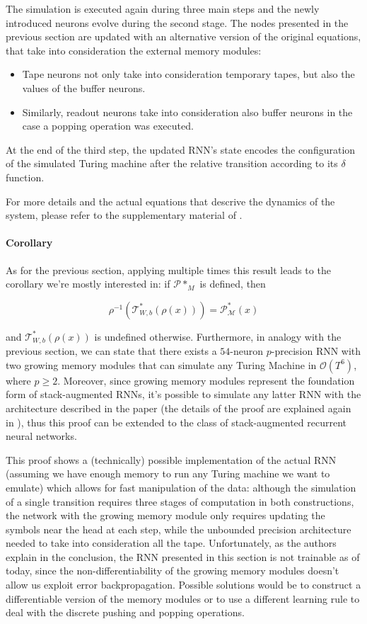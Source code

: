 \documentclass{article}
\begin{document}
The simulation is executed again during three main steps and the newly introduced neurons evolve during the second stage. The nodes presented in the previous section are updated with an alternative version of the original equations, that take into consideration the external memory modules:

\begin{itemize}
    \item Tape neurons not only take into consideration temporary tapes, but also the values of the buffer neurons.
    \item Similarly, readout neurons take into consideration also buffer neurons in the case a popping operation was executed.
\end{itemize}

At the end of the third step, the updated RNN's state encodes the configuration of the simulated Turing machine after the relative transition according to its $\delta$ function.

For more details and the actual equations that descrive the dynamics of the system, please refer to the supplementary material of \cite{CHU21}.

\paragraph{Corollary}
As for the previous section, applying multiple times this result leads to the corollary we're mostly interested in: if $\mathcal{P}*_{M}$ is defined, then

$$\rho^{-1}(\mathcal{T}^*_{W,b}(\rho(x))) = \mathcal{P}^*_{\mathcal{M}}(x)$$

and $\mathcal{T}^*_{W,b}(\rho(x))$ is undefined otherwise.
Furthermore, in analogy with the previous section, we can state that there exists a $54$-neuron $p$-precision RNN with two growing memory modules that can simulate any Turing Machine in $\mathcal{O}(T^6)$, where $p \geq 2$. Moreover, since growing memory modules represent the foundation form of stack-augmented RNNs, it's possible to simulate any latter RNN with the architecture described in the paper (the details of the proof are explained again in \cite{CHU21}), thus this proof can be extended to the class of stack-augmented recurrent neural networks.

This proof shows a (technically) possible implementation of the actual RNN (assuming we have enough memory to run any Turing machine we want to emulate) which allows for fast manipulation of the data: although the simulation of a single transition requires three stages of computation in both constructions, the network with the growing memory module only requires updating the symbols near the head at each step, while the unbounded precision architecture needed to take into consideration all the tape.
Unfortunately, as the authors explain in the conclusion, the RNN presented in this section is not trainable as of today, since the non-differentiability of the growing memory modules doesn't allow us exploit error backpropagation. Possible solutions would be to construct a differentiable version of the memory modules or to use a different learning rule to deal with the discrete pushing and popping operations.
\end{document}
